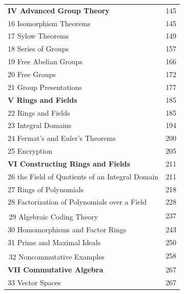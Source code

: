 \documentclass[11pt,oneside]{article}
\begin{document}
\begin{longtable}{@{}p{.83\linewidth}r@{}}
\textbf{IV Advanced Group Theory} & 145\\
\hspace*{1em}16 Isomorphism Theorems & 145\\
\hspace*{1em}17 Sylow Theorems & 149\\
\hspace*{1em}18 Series of Groups & 157\\
\hspace*{1em}19 Free Abelian Groups & 166\\
\hspace*{1em}20 Free Groups & 172\\
\hspace*{1em}21 Group Presentations & 177\\
\textbf{V Rings and Fields} & 185\\
\hspace*{1em}22 Rings and Fields & 185\\
\hspace*{1em}23 Integral Domains & 194\\
\hspace*{1em}24 Fermat’s and Euler’s Theorems & 200\\
\hspace*{1em}25 Encryption & 205\\
\textbf{VI Constructing Rings and Fields} & 211\\
\hspace*{1em}26 the Field of Quotients of an Integral Domain & 211\\
\hspace*{1em}27 Rings of Polynomials & 218\\
\hspace*{1em}28 Factorization of Polynomials over a Field & 228\\
\hspace*{1em}\textsuperscript{\BookInline{\dagger}}\,29 Algebraic Coding Theory & 237\\
\hspace*{1em}30 Homomorphisms and Factor Rings & 243\\
\hspace*{1em}31 Prime and Maximal Ideals & 250\\
\hspace*{1em}\textsuperscript{\BookInline{\dagger}}\,32 Noncommutative Examples & 258\\
\textbf{VII Commutative Algebra} & 267\\
\hspace*{1em}33 Vector Spaces & 267\\

\end{longtable}
\end{document}
